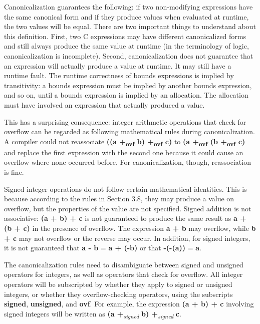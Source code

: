 \documentclass[]{article}
\begin{document}
Canonicalization guarantees the following: if two non-modifying
expressions have the same canonical form and if they produce values when
evaluated at runtime, the two values will be equal. There are two
important things to understand about this definition. First, two C
expressions may have different canonicalized forms and still always
produce the same value at runtime (in the terminology of logic,
canonicalization is incomplete). Second, canonicalization does not
guarantee that an expression will actually produce a value at runtime.
It may still have a runtime fault. The runtime correctness of bounds
expressions is implied by transitivity: a bounds expression must be
implied by another bounds expression, and so on, until a bounds
expression is implied by an allocation. The allocation must have
involved an expression that actually produced a value.

This has a surprising consequence: integer arithmetic operations that
check for overflow can be regarded as following mathematical rules
during canonicalization. A compiler could not reassociate \textbf{((a
+\textsubscript{ovf} b) +\textsubscript{ovf} c)} to \textbf{(a
+\textsubscript{ovf} (b +\textsubscript{ovf} c)} and replace the first
expression with the second one because it could cause an overflow where
none occurred before. For canonicalization, though, reassociation is
fine.

Signed integer operations do not follow certain mathematical identities.
This is because according to the rules in Section 3.8, they may produce
a value on overflow, but the properties of the value are not specified.
Signed addition is not associative: \textbf{(a + b) + c} is not
guaranteed to produce the same result as \textbf{a + (b + c)} in the
presence of overflow. The expression \textbf{a + b} may overflow, while
\textbf{b + c} may not overflow or the reverse may occur. In addition,
for signed integers, it is not guaranteed that \textbf{a - b} =
\textbf{a + (-b)} or that \textbf{-(-(a))} = \textbf{a}.

The canonicalization rules need to disambiguate between signed and
unsigned operators for integers, as well as operators that check for
overflow. All integer operators will be subscripted by whether they
apply to signed or unsigned integers, or whether they overflow-checking
operators, using the subscripts \textbf{signed}, \textbf{unsigned}, and
\textbf{ovf}. For example, the expression \textbf{(a + b) + c} involving
signed integers will be written as \textbf{(a
+}\emph{\textsubscript{signed}} \textbf{b)
+}\emph{\textsubscript{signed}} \textbf{c}.
\end{document}
